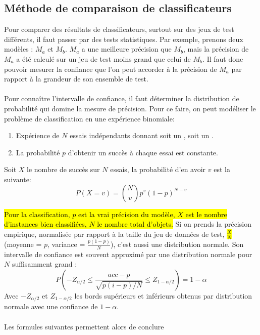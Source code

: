 \documentclass[letterpaper, 12pt]{article}
\newcommand{\alinea}{
\hspace*{0.5cm}}
\newcommand{\myul}[1]{
		\underline{\smash{#1}}
	}
\begin{document}
		\subsection{Méthode de comparaison de classificateurs}
		\alinea Pour comparer des résultats de classificateurs,
			surtout sur des jeux de test différents, il faut 
			passer par des tests statistiques. Par exemple,
			prenons deux modèles : $M_a$ et $M_b$. $M_a$ a une 
			meilleure précision que $M_b$, mais la précision de $M_a$
			a été calculé sur un jeu de test moins grand que celui de
			$M_b$. Il faut donc pouvoir mesurer la confiance que l'on
			peut accorder à la précision de $M_a$ par rapport à la
			grandeur de son ensemble de test.\\
		~\\
		\alinea Pour connaître l'intervalle de confiance, 
			il faut déterminer la distribution de probabilité
			qui domine la mesure de précision. Pour ce faire,
			on peut modéliser le problème de classification en
			une expérience binomiale:
			\begin{enumerate}
				\setlength{\itemsep}{0pt}
				\setlength{\parskip}{0pt}
				\setlength{\parsep}{0pt}
				\item Expérience de $N$ essais indépendants 
					donnant soit un \myul{succès}, 
					soit un \myul{échec}.
				\item La probabilité $p$ d'obtenir un succès à chaque
					essai est constante.
			\end{enumerate}
		\newpage
			Soit $X$ le nombre de succès sur $N$ essais, la 
			probabilité d'en avoir $v$ est la suivante:
			$$ P(X=v) = \binom{N}{v} p^v (1 - p)^{N-v} $$
		\alinea \hl{Pour la classification, $p$ est la vrai précision
			du modèle, $X$ est le nombre d'instances bien classifiées,
			$N$ le nombre total d'objets.} Si on prends la précision
			empirique, normalisée par rapport à la taille du jeu
			de données de test, \hl{$\frac{X}{N}$} (moyenne = $p$, 
			variance = $\frac{p(1 - p)}{N}$), c'est aussi une 
			distribution normale. Son intervalle de confiance est
			souvent approximé par une distribution normale pour
			$N$ suffisamment grand : 
			$$ P \left( -Z_{\alpha/2} \leq \frac{acc - p}%
				{\sqrt{p(i-p)/N}} \leq Z_{1-\alpha/2} \right) 
						= 1 - \alpha $$
			Avec $-Z_{\alpha/2}$ et $Z_{1-\alpha/2}$ les bords
			supérieurs et inférieurs
			obtenus par distribution normale avec une confiance de 
			$1-\alpha$.\\
		~\\
		\alinea Les formules suivantes permettent alors de conclure
\end{document}
